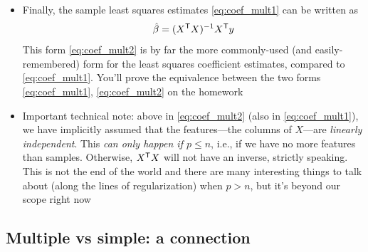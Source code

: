\documentclass{article}
\begin{document}
\begin{itemize}
\item Finally, the sample least squares estimates \eqref{eq:coef_mult1} can 
  be written as 
  \begin{equation}
  \label{eq:coef_mult2}
  \hat{\beta} = (X^{\mathsf{T}} X)^{-1} X^{\mathsf{T}} y  
  \end{equation}
  This form \eqref{eq:coef_mult2} is by far the more commonly-used (and
  easily-remembered) form for the least squares coefficient estimates, compared
  to \eqref{eq:coef_mult1}. You'll prove the equivalence between the two
  forms \eqref{eq:coef_mult1}, \eqref{eq:coef_mult2} on the homework 

\item Important technical note: above in \eqref{eq:coef_mult2} (also in
  \eqref{eq:coef_mult1}), we have implicitly assumed that the features---the 
  columns of $X$---are \emph{linearly independent}. This \emph{can only happen
    if $p \leq n$}, i.e., if we have no more features than samples. Otherwise,
  $X^{\mathsf{T}} X$ will not have an inverse, strictly speaking. This is not the end of
  the world and there are many interesting things to talk about (along the lines
  of regularization) when $p > n$, but it's beyond our scope right now
\end{itemize}

\subsection{Multiple vs simple: a connection}
\end{document}

